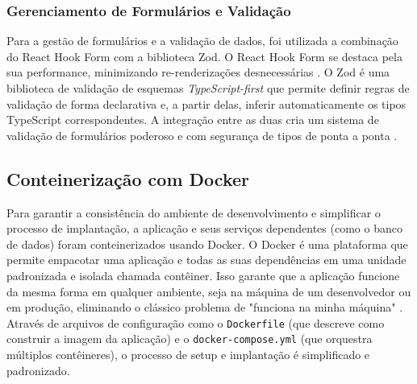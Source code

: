 \subsubsection{Gerenciamento de Formulários e Validação}
Para a gestão de formulários e a validação de dados, foi utilizada a combinação do React Hook Form com a biblioteca Zod. O React Hook Form se destaca pela sua performance, minimizando re-renderizações desnecessárias \cite{reacthookform2025getstarted}. O Zod é uma biblioteca de validação de esquemas \textit{TypeScript-first} que permite definir regras de validação de forma declarativa e, a partir delas, inferir automaticamente os tipos TypeScript correspondentes. A integração entre as duas cria um sistema de validação de formulários poderoso e com segurança de tipos de ponta a ponta \cite{contentful2024zod}.

\subsection{Conteinerização com Docker}

Para garantir a consistência do ambiente de desenvolvimento e simplificar o processo de implantação, a aplicação e seus serviços dependentes (como o banco de dados) foram conteinerizados usando Docker. O Docker é uma plataforma que permite empacotar uma aplicação e todas as suas dependências em uma unidade padronizada e isolada chamada contêiner. Isso garante que a aplicação funcione da mesma forma em qualquer ambiente, seja na máquina de um desenvolvedor ou em produção, eliminando o clássico problema de "funciona na minha máquina" \cite{docker2025overview}. Através de arquivos de configuração como o \texttt{Dockerfile} (que descreve como construir a imagem da aplicação) e o \texttt{docker-compose.yml} (que orquestra múltiplos contêineres), o processo de setup e implantação é simplificado e padronizado.
